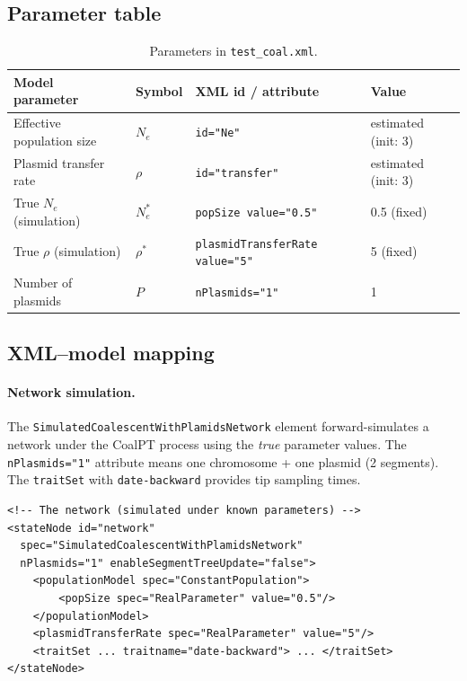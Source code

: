 \documentclass[11pt]{article}
\begin{document}
\subsection{Parameter table}

\begin{table}[H]
\centering
\begin{tabular}{@{} l l l l @{}}
\toprule
\textbf{Model parameter} & \textbf{Symbol} & \textbf{XML id / attribute} & \textbf{Value} \\
\midrule
Effective population size & $N_e$ & \texttt{id="Ne"} & estimated (init: 3) \\
Plasmid transfer rate & $\rho$ & \texttt{id="transfer"} & estimated (init: 3) \\
True $N_e$ (simulation) & $N_e^*$ & \texttt{popSize value="0.5"} & 0.5 (fixed) \\
True $\rho$ (simulation) & $\rho^*$ & \texttt{plasmidTransferRate value="5"} & 5 (fixed) \\
Number of plasmids & $P$ & \texttt{nPlasmids="1"} & 1 \\
\bottomrule
\end{tabular}
\caption{Parameters in \texttt{test\_coal.xml}.}
\end{table}

\subsection{XML--model mapping}

\noindent\begin{minipage}{\linewidth}
\paragraph{Network simulation.}
The \texttt{SimulatedCoalescentWithPlamidsNetwork} element forward-simulates a network under the CoalPT process using the \emph{true} parameter values. The \texttt{nPlasmids="1"} attribute means one chromosome + one plasmid (2 segments). The \texttt{traitSet} with \texttt{date-backward} provides tip sampling times.
\begin{lstlisting}
<!-- The network (simulated under known parameters) -->
<stateNode id="network"
  spec="SimulatedCoalescentWithPlamidsNetwork"
  nPlasmids="1" enableSegmentTreeUpdate="false">
    <populationModel spec="ConstantPopulation">
        <popSize spec="RealParameter" value="0.5"/>
    </populationModel>
    <plasmidTransferRate spec="RealParameter" value="5"/>
    <traitSet ... traitname="date-backward"> ... </traitSet>
</stateNode>
\end{lstlisting}
\end{minipage}
\end{document}
